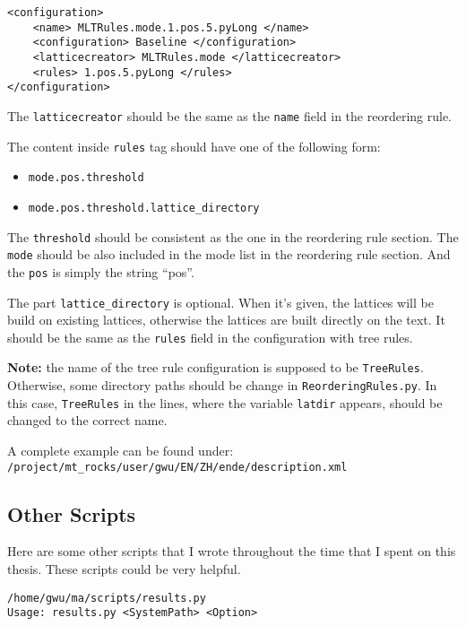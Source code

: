 \begin{Verbatim}[frame=single]
<configuration>
    <name> MLTRules.mode.1.pos.5.pyLong </name>
    <configuration> Baseline </configuration>
    <latticecreator> MLTRules.mode </latticecreator>
    <rules> 1.pos.5.pyLong </rules>
</configuration>
\end{Verbatim}
The \verb|latticecreator| should be the same as the \verb|name| field in the reordering rule. 

The content inside \verb|rules| tag should have one of the following form:
\begin{itemize}
  \setlength{\itemsep}{0cm}%
  \setlength{\parskip}{0cm}%
  \item \verb|mode.pos.threshold| 
  \item \verb|mode.pos.threshold.lattice_directory|
\end{itemize}

The \verb|threshold| should be consistent as the one in the reordering rule section. The \verb|mode| should be also included in the mode list in the reordering rule section. And the \verb|pos| is simply the string ``pos''.

The part \verb|lattice_directory| is optional. When it's given, the lattices will be build on existing lattices, otherwise the lattices are built directly on the text. It should be the same as the \verb|rules| field in the configuration with tree rules. 


\label{note}\textbf{Note:} the name of the tree rule configuration is supposed to be \verb|TreeRules|. Otherwise, some directory paths should be change in \verb|ReorderingRules.py|. In this case, \verb|TreeRules| in the lines, where the variable \verb|latdir| appears, should be changed to the correct name.


A complete example can be found under:\\
\verb|/project/mt_rocks/user/gwu/EN/ZH/ende/description.xml|

\subsection{Other Scripts}

Here are some other scripts that I wrote throughout the time that I spent on this thesis. These scripts could be very helpful.

\verb|/home/gwu/ma/scripts/results.py|\\
\verb|Usage: results.py <SystemPath> <Option>|

